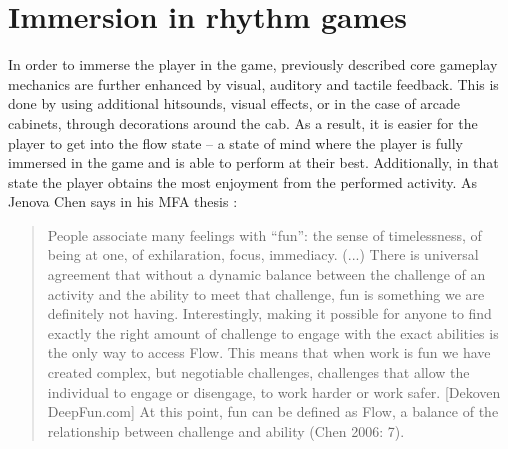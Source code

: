 \section{Immersion in rhythm games}
In order to immerse the player in the game, previously described core gameplay mechanics are further enhanced by visual, auditory and tactile feedback. This is done by using additional hitsounds, visual effects, or in the case of arcade cabinets, through decorations around the cab. As a result, it is easier for the player to get into the flow state -- a state of mind where the player is fully immersed in the game and is able to perform at their best. Additionally, in that state the player obtains the most enjoyment from the performed activity. As Jenova Chen says in his MFA thesis \cite{chen2006flow}:
\begin{quote}
    People associate many feelings with ``fun'': the sense of timelessness, of being at one, of exhilaration, focus, immediacy. (...) There is universal agreement that without a dynamic balance between the challenge of an activity and the ability to meet that challenge, fun is something we are definitely not having. Interestingly, making it possible for anyone to find exactly the right amount of challenge to engage with the exact abilities is the only way to access Flow. This means that when work is fun we have created complex, but negotiable challenges, challenges that allow the individual to engage or disengage, to work harder or work safer. [Dekoven DeepFun.com] At this point, fun can be defined as Flow, a balance of the relationship between challenge and ability (Chen 2006: 7).
\end{quote}
